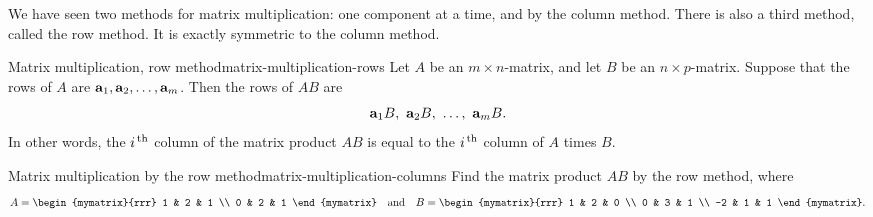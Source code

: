 We have seen two methods for matrix multiplication: one component at a
time, and by the column method. There is also a third method, called
the row method. It is exactly symmetric to the column method.

\begin{proposition}{Matrix multiplication, row method}{matrix-multiplication-rows}
  Let $A$ be an $m\times n$-matrix, and let $B$ be an
  $n\times p$-matrix.  Suppose that the rows of $A$ are
  $\mbox{\bf a}_1,\mbox{\bf a}_2,\ldots,\mbox{\bf a}_m$. Then the rows of $AB$
  are%
  \begin{equation*}
    \mbox{\bf a}_1B,~\mbox{\bf a}_2B,~\ldots,~\mbox{\bf a}_mB.
  \end{equation*}
  In other words, the $i^{\,\rm th}$ column of the matrix product $AB$ is
  equal to the $i^{\,\rm th}$ column of $A$ times $B$.
\end{proposition}

\begin{example}{Matrix multiplication by the row method}{matrix-multiplication-columns}
  Find the matrix product $AB$ by the row method, where
  \begin{equation*}
    A = \begin{mymatrix}{rrr}
      1 & 2 & 1 \\
      0 & 2 & 1
    \end{mymatrix}
    \quad\mbox{and}\quad
    B = \begin{mymatrix}{rrr}
      1 & 2 & 0 \\
      0 & 3 & 1 \\
      -2 & 1 & 1
    \end{mymatrix}.
  \end{equation*}
\end{example}

